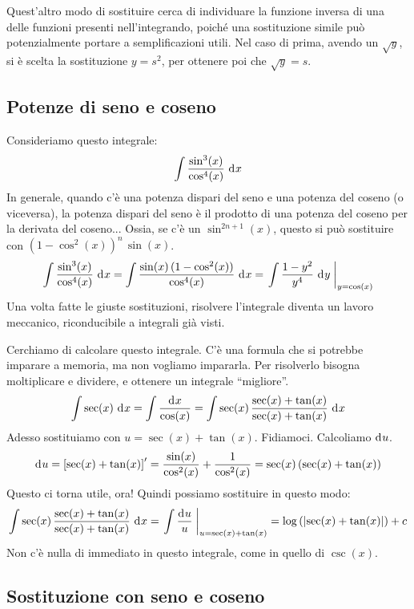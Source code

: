 Quest'altro modo di sostituire cerca di individuare la funzione inversa di una delle funzioni presenti nell'integrando, poich\'e una sostituzione simile pu\`o potenzialmente portare a semplificazioni utili. Nel caso di prima, avendo un $\sqrt{y}$, si \`e scelta la sostituzione $y = s^2$, per ottenere poi che $\sqrt{y} = s$.

\subsection{Potenze di seno e coseno}

Consideriamo questo integrale:
\[
\int \frac{\sin^3(x)}{\cos^4(x)} \dx
\]
In generale, quando c'\`e una potenza dispari del seno e una potenza del coseno (o viceversa), la potenza dispari del seno \`e il prodotto di una potenza del coseno per la derivata del coseno... Ossia, se c'\`e un $\sin^{2 n + 1} (x)$, questo si pu\`o sostituire con $(1 - \cos^2(x))^{n} \, \sin(x)$.
\[
\int \frac{\sin^3(x)}{\cos^4(x)} \dx =
\int \frac{\sin(x) \, (1 - \cos^2(x))}{\cos^4(x)} \dx =
\substitute{\int \frac{1 - y^2}{y^4} \dx[y]}{y = \cos(x)}
\]
Una volta fatte le giuste sostituzioni, risolvere l'integrale diventa un lavoro meccanico, riconducibile a integrali gi\`a visti.

Cerchiamo di calcolare questo integrale. C'\`e una formula che si potrebbe imparare a memoria, ma non vogliamo impararla. Per risolverlo bisogna moltiplicare e dividere, e ottenere un integrale ``migliore''.
\[
\int \sec (x) \dx = \int \frac{\diff x}{\cos (x)} = 
\int \sec (x) \, \frac{\sec(x) + \tan (x)}{\sec (x) + \tan (x)} \dx
\]
Adesso sostituiamo con $u = \sec (x) + \tan (x)$. Fidiamoci. Calcoliamo $\diff u$.
\[
\diff u = \left[ \sec(x) + \tan (x) \right]' =
\frac{\sin (x)}{\cos^2 (x)} + \frac{1}{\cos^2 (x)} =
\sec (x) \, (\sec (x) + \tan (x))
\]
Questo ci torna utile, ora! Quindi possiamo sostituire in questo modo:
\[
\int \sec (x) \, \frac{\sec(x) + \tan (x)}{\sec (x) + \tan (x)} \dx =
\substitute{\int \frac{\diff u}{u}}{u = \sec(x) + \tan(x)} =
\abslog{\sec(x) + \tan(x)} + c
\]
Non c'\`e nulla di immediato in questo integrale, come in quello di $\csc(x)$.

\subsection{Sostituzione con seno e coseno}

